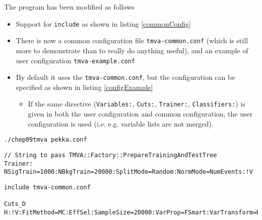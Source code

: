 \begin{appendix}
The program has been modified as follows
\begin{itemize}
\item Support for \texttt{include} as shown in listing
  \ref{commonConfig}
\item There is now a common configuration file
  \texttt{tmva-common.conf} (which is still more to demonstrate than
  to really do anything useful), and an example of user configuration
  \texttt{tmva-example.conf}
\item By default it uses the \texttt{tmva-common.conf}, but the
  configuration can be specified as shown in listing \ref{configExample}
  \begin{itemize}
  \item If the same directive (\texttt{Variables:}, \texttt{Cuts:},
    \texttt{Trainer:}, \texttt{Classifiers:}) is given in both the
    user configuration and common configuration, the user
    configuration is used (i.e. e.g. variable lists are not merged).
  \end{itemize}
\end{itemize}



\begin{lstlisting}
./chep09tmva pekka.conf
\end{lstlisting}

\begin{lstlisting}
// String to pass TMVA::Factory::PrepareTrainingAndTestTree
Trainer:
NSigTrain=1000:NBkgTrain=20000:SplitMode=Random:NormMode=NumEvents:!V
\end{lstlisting}

\begin{lstlisting}
include tmva-common.conf

Cuts_D H:!V:FitMethod=MC:EffSel:SampleSize=20000:VarProp=FSmart:VarTransform=Decorrelate
\end{lstlisting}


\end{appendix}
